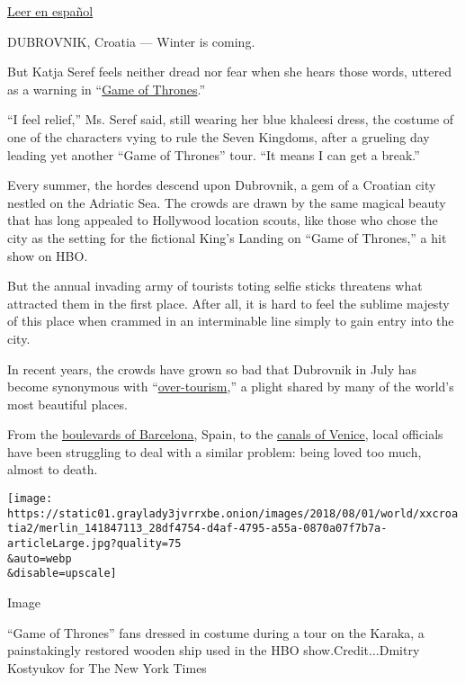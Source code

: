 \href{https://www.nytimes3xbfgragh.onion/es/2018/08/21/juego-tronos-dubrovnik-turismo/}{Leer
en español}

DUBROVNIK, Croatia --- Winter is coming.

But Katja Seref feels neither dread nor fear when she hears those words,
uttered as a warning in
``\href{https://www.nytimes3xbfgragh.onion/column/game-of-thrones-tv-recaps}{Game
of Thrones}.''

``I feel relief,'' Ms. Seref said, still wearing her blue khaleesi
dress, the costume of one of the characters vying to rule the Seven
Kingdoms, after a grueling day leading yet another ``Game of Thrones''
tour. ``It means I can get a break.''

Every summer, the hordes descend upon Dubrovnik, a gem of a Croatian
city nestled on the Adriatic Sea. The crowds are drawn by the same
magical beauty that has long appealed to Hollywood location scouts, like
those who chose the city as the setting for the fictional King's Landing
on ``Game of Thrones,'' a hit show on HBO.

But the annual invading army of tourists toting selfie sticks threatens
what attracted them in the first place. After all, it is hard to feel
the sublime majesty of this place when crammed in an interminable line
simply to gain entry into the city.

In recent years, the crowds have grown so bad that Dubrovnik in July has
become synonymous with
``\href{https://www.nytimes3xbfgragh.onion/2015/07/19/opinion/sunday/the-revolt-against-tourism.html}{over-tourism},''
a plight shared by many of the world's most beautiful places.

From the
\href{https://www.cntraveler.com/story/barcelona-approves-new-law-to-limit-tourist-numbers}{boulevards
of Barcelona}, Spain, to the
\href{https://www.nytimes3xbfgragh.onion/2017/08/02/world/europe/venice-italy-tourist-invasion.html}{canals
of Venice}, local officials have been struggling to deal with a similar
problem: being loved too much, almost to death.

\texttt{[image: https://static01.graylady3jvrrxbe.onion/images/2018/08/01/world/xxcroatia2/merlin\_141847113\_28df4754-d4af-4795-a55a-0870a07f7b7a-articleLarge.jpg?quality=75\\\&auto=webp\\\&disable=upscale]}

Image

``Game of Thrones'' fans dressed in costume during a tour on the Karaka,
a painstakingly restored wooden ship used in the HBO
show.Credit...Dmitry Kostyukov for The New York Times

